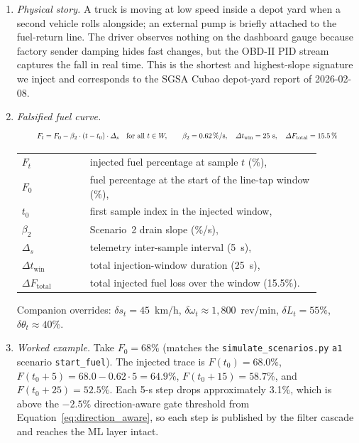 \begin{enumerate}[label=\textbf{(\alph*)}, leftmargin=*]
    \item \textit{Physical story.} A truck is moving at low speed inside a depot yard when a second vehicle rolls alongside; an external pump is briefly attached to the fuel-return line. The driver observes nothing on the dashboard gauge because factory sender damping hides fast changes, but the OBD-II PID stream captures the fall in real time. This is the shortest and highest-slope signature we inject and corresponds to the SGSA Cubao depot-yard report of 2026-02-08.

    \item \textit{Falsified fuel curve.}
    \begin{equation}
    \resizebox{0.88\linewidth}{!}{$\displaystyle
    F_t = F_0 - \beta_2 \cdot (t - t_0) \cdot \Delta_s \quad \text{for all } t \in W, \qquad \beta_2 = 0.62\,\%/\text{s}, \quad \Delta t_{\mathrm{win}} = 25\text{ s}, \quad \Delta F_{\mathrm{total}} = 15.5\,\%
    $}
    \label{eq:injection_s2}
    \end{equation}
    \noindent\begin{tabular}{@{}p{0.20\linewidth}@{\quad}p{0.68\linewidth}@{}}
    $F_t$ & injected fuel percentage at sample $t$ (\%), \\
    $F_0$ & fuel percentage at the start of the line-tap window (\%), \\
    $t_0$ & first sample index in the injected window, \\
    $\beta_2$ & Scenario~2 drain slope (\%/s), \\
    $\Delta_s$ & telemetry inter-sample interval (5~s), \\
    $\Delta t_{\mathrm{win}}$ & total injection-window duration (25~s), \\
    $\Delta F_{\mathrm{total}}$ & total injected fuel loss over the window (15.5\%).
    \end{tabular}

    \vspace{0.5em}
    Companion overrides: $\delta s_t = 45$~km/h, $\delta \omega_t \approx 1{,}800$~rev/min, $\delta L_t = 55\%$, $\delta \theta_t \approx 40\%$.

    \item \textit{Worked example.} Take $F_0 = 68\%$ (matches the \texttt{simulate\_scenarios.py} \texttt{a1} scenario \texttt{start\_fuel}). The injected trace is $F(t_0) = 68.0\%$, $F(t_0 + 5) = 68.0 - 0.62 \cdot 5 = 64.9\%$, $F(t_0 + 15) = 58.7\%$, and $F(t_0 + 25) = 52.5\%$. Each 5-s step drops approximately 3.1\%, which is above the $-2.5\%$ direction-aware gate threshold from Equation~\ref{eq:direction_aware}, so each step is published by the filter cascade and reaches the ML layer intact.


\end{enumerate}

